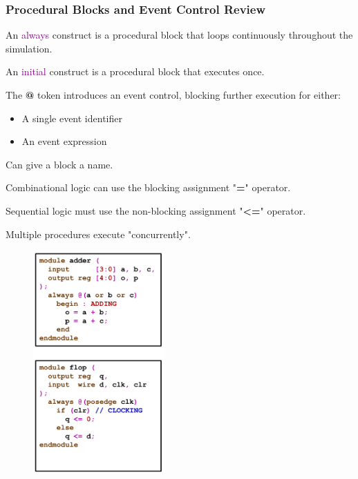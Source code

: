 \documentclass[t, notes, xcolor=table]{beamer}
\begin{document}
\begin{frame}
\frametitle{Procedural Blocks and Event Control Review}

\tiny{
\begin{multicols}{2}
An \textcolor{purple}{always} construct is a procedural block that loops continuously throughout the simulation.
\newline

An \textcolor{purple}{initial} construct is a procedural block that executes once.
\newline

The \textbf{@} token introduces an event control, blocking further execution for either:
\begin{itemize}
\item A single event identifier
\item An event expression
\end{itemize}
Can give a block a name.
\newline

Combinational logic can use the blocking assignment "\textbf{=}" operator.
\newline

Sequential logic must use the non-blocking assignment "\textbf{\textless =}" operator.
\newline

Multiple procedures execute "concurrently".
\vfill
\columnbreak
\begin{figure}
    \includegraphics[width=0.45\textwidth]{img/09_proc_event_review.png}
\end{figure}
\end{multicols}

}
\end{frame}
\end{document}
